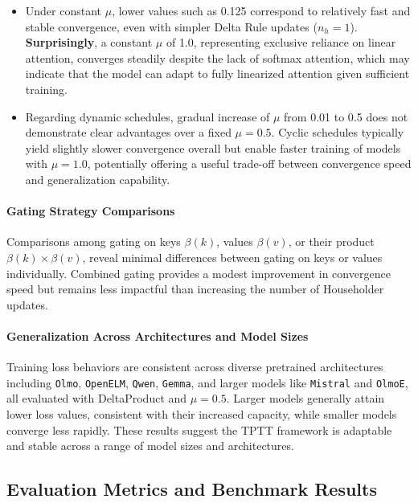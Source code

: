 \documentclass[10pt,a4paper]{article}
\begin{document}
\begin{itemize}
    \item Under constant \(\mu\), lower values such as 0.125 correspond to relatively fast and stable convergence, even with simpler Delta Rule updates (\(n_h=1\)). \textbf{Surprisingly}, a constant \(\mu\) of 1.0, representing exclusive reliance on linear attention, converges steadily despite the lack of softmax attention, which may indicate that the model can adapt to fully linearized attention given sufficient training.
    \item Regarding dynamic schedules, gradual increase of \(\mu\) from 0.01 to 0.5 does not demonstrate clear advantages over a fixed \(\mu = 0.5\). Cyclic schedules typically yield slightly slower convergence overall but enable faster training of models with \(\mu=1.0\), potentially offering a useful trade-off between convergence speed and generalization capability.
\end{itemize}

\paragraph{Gating Strategy Comparisons}

Comparisons among gating on keys \(\beta(k)\), values \(\beta(v)\), or their product \(\beta(k) \times \beta(v)\), reveal minimal differences between gating on keys or values individually. Combined gating provides a modest improvement in convergence speed but remains less impactful than increasing the number of Householder updates.

\paragraph{Generalization Across Architectures and Model Sizes}

Training loss behaviors are consistent across diverse pretrained architectures including \texttt{Olmo}, \texttt{OpenELM}, \texttt{Qwen}, \texttt{Gemma}, and larger models like \texttt{Mistral} and \texttt{OlmoE}, all evaluated with DeltaProduct and \(\mu=0.5\). Larger models generally attain lower loss values, consistent with their increased capacity, while smaller models converge less rapidly. These results suggest the TPTT framework is adaptable and stable across a range of model sizes and architectures.


\subsection{Evaluation Metrics and Benchmark Results}
\end{document}
